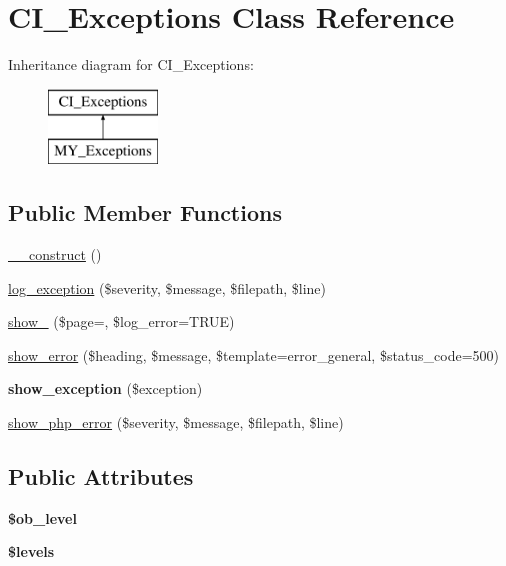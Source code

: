 \hypertarget{class_c_i___exceptions}{}\section{C\+I\+\_\+\+Exceptions Class Reference}
\label{class_c_i___exceptions}
Inheritance diagram for C\+I\+\_\+\+Exceptions\+:\begin{figure}[H]
\begin{center}
\leavevmode
\includegraphics[height=2.000000cm]{class_c_i___exceptions}
\end{center}
\end{figure}
\subsection*{Public Member Functions}
\begin{DoxyCompactItemize}
\item 
\mbox{\hyperlink{class_c_i___exceptions_ac9cc7d0bb90a5e2ae6eef7753a771a91}{\+\_\+\+\_\+construct}} ()
\item 
\mbox{\hyperlink{class_c_i___exceptions_a49d733e9740d9d638829a1854d67fffe}{log\+\_\+exception}} (\$severity, \$message, \$filepath, \$line)
\item 
\mbox{\hyperlink{class_c_i___exceptions_a4f8e5eda67ea01e7260f1b566c2a76ef}{show\+\_}} (\$page=\textquotesingle{}\textquotesingle{}, \$log\+\_\+error=T\+R\+UE)
\item 
\mbox{\hyperlink{class_c_i___exceptions_aef09cc9836c95b0b7bfa032aee4e02d4}{show\+\_\+error}} (\$heading, \$message, \$template=\textquotesingle{}error\+\_\+general\textquotesingle{}, \$status\+\_\+code=500)
\item 
\mbox{\label{class_c_i___exceptions_a41ee5bbd57e37065891ae5de652e0bfb}} 
{\bfseries show\+\_\+exception} (\$exception)
\item 
\mbox{\hyperlink{class_c_i___exceptions_abcd98d0e5e512608dfbd2b820d9f57f2}{show\+\_\+php\+\_\+error}} (\$severity, \$message, \$filepath, \$line)
\end{DoxyCompactItemize}
\subsection*{Public Attributes}
\begin{DoxyCompactItemize}
\item 
\mbox{\label{class_c_i___exceptions_ac4863d069eb6ab433cbb803a5f799f89}} 
{\bfseries \$ob\+\_\+level}
\item 
{\bfseries \$levels}
\end{DoxyCompactItemize}


